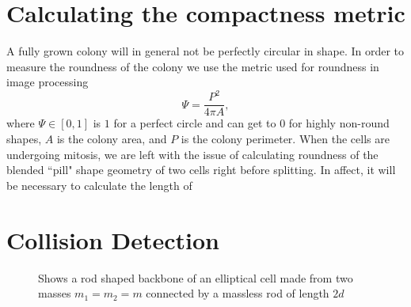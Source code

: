 \section{Calculating the compactness metric}
A fully grown colony will in general not be perfectly circular in shape. In order to measure the roundness of the colony we use the metric used for roundness in image processing
\begin{equation}
    \Psi = \frac{P^2}{4 \pi A},
\end{equation}
where $\Psi \in [0,1]$ is $1$ for a perfect circle and can get to $0$ for highly non-round shapes, $A$ is the colony area, and $P$ is the colony perimeter. When the cells are undergoing mitosis, we are left with the issue of calculating roundness of the blended ``pill" shape geometry of two cells right before splitting. In affect, it will be necessary to calculate the length of 


\section{Collision Detection}

\begin{figure}
    \centering
    \caption{Shows a rod shaped backbone of an elliptical cell made from two masses $m_1 = m_2 = m$ connected by a massless rod of length $2d$}
    \label{fig:rod}
\end{figure}



